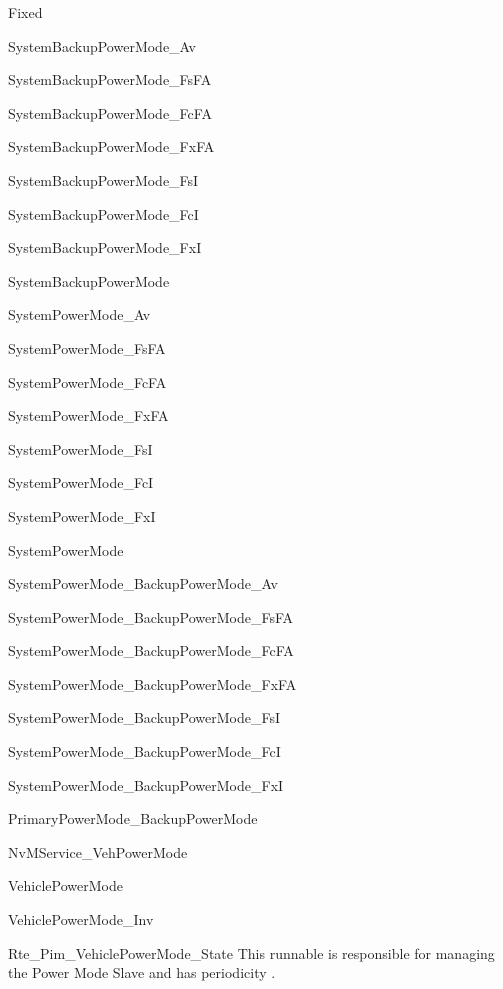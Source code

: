 {
{Fixed}
{}
{SystemBackupPowerMode_Av

SystemBackupPowerMode_FsFA

SystemBackupPowerMode_FcFA

SystemBackupPowerMode_FxFA

SystemBackupPowerMode_FsI

SystemBackupPowerMode_FcI

SystemBackupPowerMode_FxI

SystemBackupPowerMode

SystemPowerMode_Av

SystemPowerMode_FsFA

SystemPowerMode_FcFA

SystemPowerMode_FxFA

SystemPowerMode_FsI

SystemPowerMode_FcI

SystemPowerMode_FxI

SystemPowerMode

SystemPowerMode_BackupPowerMode_Av

SystemPowerMode_BackupPowerMode_FsFA

SystemPowerMode_BackupPowerMode_FcFA

SystemPowerMode_BackupPowerMode_FxFA

SystemPowerMode_BackupPowerMode_FsI

SystemPowerMode_BackupPowerMode_FcI

SystemPowerMode_BackupPowerMode_FxI

PrimaryPowerMode_BackupPowerMode}
{NvMService_VehPowerMode

VehiclePowerMode

VehiclePowerMode_Inv}
{Rte_Pim_VehiclePowerMode_State}
{}
{This runnable is responsible for managing the Power Mode Slave and has periodicity .
}}
{     }

